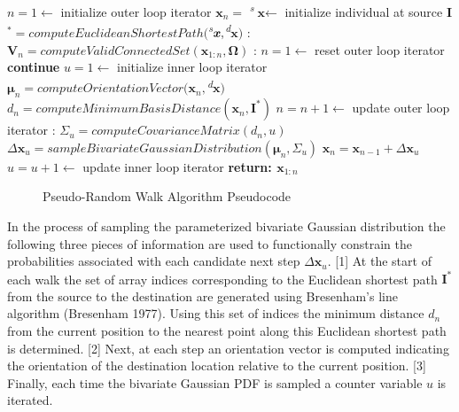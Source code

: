                 \begin{algorithm}
                \caption{}\label{euclid}
                \begin{algorithmic}[1]
                \State $n = 1 \gets$ initialize outer loop iterator
                \State $\textbf{x}_n =$ \textsuperscript{\textit{s}}$\textbf{x} \gets$ initialize individual at source
                \State \textbf{I}$^{*} = computeEuclideanShortestPath($\textsuperscript{\textit{s}}$\textbf{\textit{x}},$\textsuperscript{\textit{d}}$\textbf{x})$
                :
                \State $\textbf{V}_n = computeValidConnectedSet(\textbf{x}_{1:n},\boldsymbol\Omega)$
                :
                \State $n = 1 \gets$ reset outer loop iterator
                \State \textbf{continue}
                \EndIf
                \State $u = 1 \gets$ initialize inner loop iterator
                \State $\boldsymbol{\mu}_n = computeOrientationVector(\textbf{x}_n,$\textsuperscript{\textit{d}}$\textbf{x})$
                \State $d_n = computeMinimumBasisDistance(\textbf{x}_{n},\textbf{I}^{*})$
                \State $n = n + 1 \gets$ update outer loop iterator
                :
                \State $\Sigma_u = computeCovarianceMatrix(d_n,u)$
                \State $\Delta\textbf{x}_u = sampleBivariateGaussianDistribution(\boldsymbol\mu_n,\Sigma_u)$
                \State $\textbf{x}_{n} = \textbf{x}_{n-1} + \Delta\textbf{x}_{u}$
                \State $u = u + 1 \gets$ update inner loop iterator
                \EndWhile {}
                \EndWhile {}
                \State \textbf{return: $\textbf{x}_{1:n}$}
                \EndProcedure
                \end{algorithmic}
                \end{algorithm}
                
            \begin{figure}[Pseudo-Random Walk Algorithm Pseudocode]
            \caption[Pseudo-Random Walk Algorithm Pseudocode]{Pseudo-Random Walk Algorithm Pseudocode}
            \label{fig:pseudo-random-walk-pseudocode}
            \end{figure}
            
In the process of sampling the parameterized bivariate Gaussian distribution the following three pieces of information are used to functionally constrain the probabilities associated with each candidate next step $\Delta\textbf{x}_u$. [1] At the start of each walk the set of array indices corresponding to the Euclidean shortest path $\textbf{I}^*$ from the source to the destination are generated using Bresenham's line algorithm (Bresenham 1977). Using this set of indices the minimum distance $d_n$ from the current position to the nearest point along this Euclidean shortest path is determined. [2] Next, at each step an orientation vector is computed indicating the orientation of the destination location relative to the current position. [3] Finally, each time the bivariate Gaussian PDF is sampled a counter variable $u$ is iterated. 

